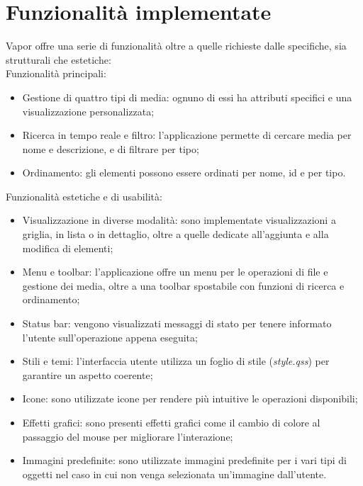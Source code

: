 \documentclass[10pt]{article}
\begin{document}
\section{Funzionalità implementate} \label{funzionalita}
Vapor offre una serie di funzionalità oltre a quelle richieste dalle specifiche, sia strutturali che estetiche:
\\Funzionalità principali:
\begin{itemize}
    \item Gestione di quattro tipi di media: ognuno di essi ha attributi specifici e una visualizzazione personalizzata;
    \item Ricerca in tempo reale e filtro: l'applicazione permette di cercare media per nome e descrizione, e di filtrare per tipo;
    \item Ordinamento: gli elementi possono essere ordinati per nome, id e per tipo.
\end{itemize}
Funzionalità estetiche e di usabilità:
\begin{itemize}
    \item Visualizzazione in diverse modalità: sono implementate visualizzazioni a griglia, in lista o in dettaglio, oltre a quelle dedicate all'aggiunta e alla modifica di elementi;
    \item Menu e toolbar: l'applicazione offre un menu per le operazioni di file e gestione dei media, oltre a una toolbar spostabile con funzioni di ricerca e ordinamento;
    \item Status bar: vengono visualizzati messaggi di stato per tenere informato l'utente sull'operazione appena eseguita;
    \item Stili e temi: l'interfaccia utente utilizza un foglio di stile (\textit{style.qss}) per garantire un aspetto coerente;
    \item Icone: sono utilizzate icone per rendere più intuitive le operazioni disponibili;
    \item Effetti grafici: sono presenti effetti grafici come il cambio di colore al passaggio del mouse per migliorare l'interazione;
    \item Immagini predefinite: sono utilizzate immagini predefinite per i vari tipi di oggetti nel caso in cui non venga selezionata un'immagine dall'utente.
\end{itemize}
\end{document}
